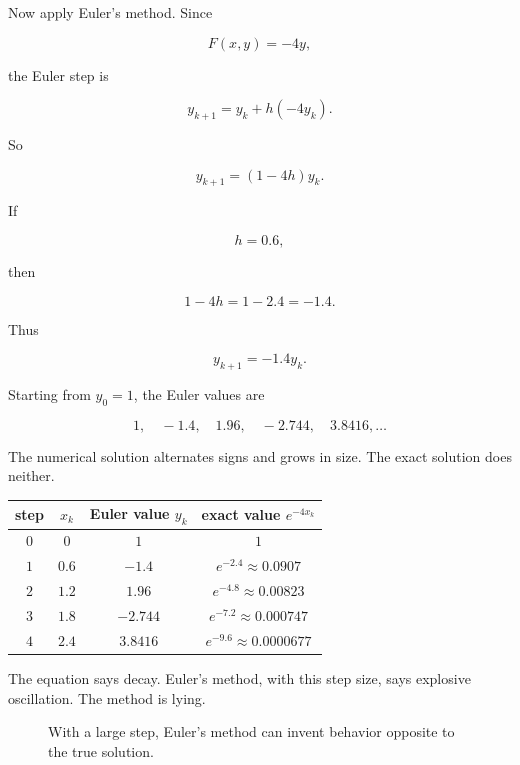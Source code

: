 Now apply Euler's method.  Since

\[
F(x,y)=-4y,
\]

the Euler step is

\[
y_{k+1}=y_k+h(-4y_k).
\]

So

\[
\boxed{
y_{k+1}=(1-4h)y_k.
}
\]

If

\[
h=0.6,
\]

then

\[
1-4h=1-2.4=-1.4.
\]

Thus

\[
y_{k+1}=-1.4y_k.
\]

Starting from \(y_0=1\), the Euler values are

\[
1,\quad -1.4,\quad 1.96,\quad -2.744,\quad 3.8416,\ldots
\]

The numerical solution alternates signs and grows in size.  The exact solution does
neither.

\begin{center}
\begin{tabular}{c|c|c|c}
\textbf{step} & \(x_k\) & \textbf{Euler value \(y_k\)} & \textbf{exact value \(e^{-4x_k}\)} \\ \hline
\(0\) & \(0\) & \(1\) & \(1\) \\
\(1\) & \(0.6\) & \(-1.4\) & \(e^{-2.4}\approx0.0907\) \\
\(2\) & \(1.2\) & \(1.96\) & \(e^{-4.8}\approx0.00823\) \\
\(3\) & \(1.8\) & \(-2.744\) & \(e^{-7.2}\approx0.000747\) \\
\(4\) & \(2.4\) & \(3.8416\) & \(e^{-9.6}\approx0.0000677\)
\end{tabular}
\end{center}

The equation says decay.  Euler's method, with this step size, says explosive
oscillation.  The method is lying.

\begin{figure}[h]
\centering
{}
\caption{With a large step, Euler's method can invent behavior opposite to the true solution.}
\label{fig:euler-large-step-false-behavior}
\end{figure}


